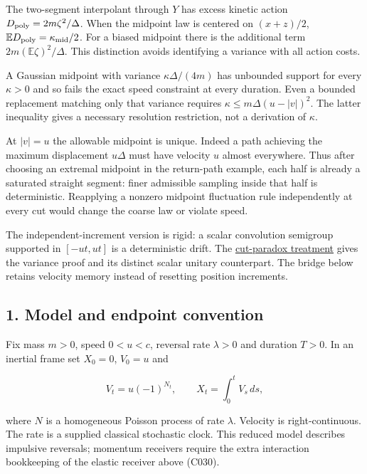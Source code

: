\documentclass[11pt,a4paper]{article}
\begin{document}
The two-segment interpolant through \(Y\) has excess kinetic action
\(D_{\rm poly}=2m\zeta^2/\Delta\). When the midpoint law is centered on
\((x+z)/2\), \(\mathbb E D_{\rm poly}=\kappa_{\rm mid}/2\). For a biased
midpoint there is the additional term \(2m(\mathbb E\zeta)^2/\Delta\).
This distinction avoids identifying a variance with all action costs.

A Gaussian midpoint with variance \(\kappa\Delta/(4m)\) has unbounded
support for every \(\kappa>0\) and so fails the exact speed constraint
at every duration. Even a bounded replacement matching only that
variance requires \(\kappa\le m\Delta(u-|v|)^2\). The latter inequality
gives a necessary resolution restriction, not a derivation of
\(\kappa\).

At \(|v|=u\) the allowable midpoint is unique. Indeed a path achieving
the maximum displacement \(u\Delta\) must have velocity \(u\) almost
everywhere. Thus after choosing an extremal midpoint in the return-path
example, each half is already a saturated straight segment: finer
admissible sampling inside that half is deterministic. Reapplying a
nonzero midpoint fluctuation rule independently at every cut would
change the coarse law or violate speed.

The independent-increment version is rigid: a scalar convolution
semigroup supported in \([-ut,ut]\) is a deterministic drift. The
\href{cut-paradox-two-faces.md\#scalar-probability-kernels}{cut-paradox
treatment} gives the variance proof and its distinct scalar unitary
counterpart. The bridge below retains velocity memory instead of
resetting position increments.

\hypertarget{model-and-endpoint-convention}{%
\subsection{1. Model and endpoint
convention}\label{model-and-endpoint-convention}}

Fix mass \(m>0\), speed \(0<u<c\), reversal rate \(\lambda>0\) and
duration \(T>0\). In an inertial frame set \(X_0=0\), \(V_0=u\) and

\[V_t=u(-1)^{N_t},\qquad X_t=\int_0^t V_s\,ds,\]

where \(N\) is a homogeneous Poisson process of rate \(\lambda\).
Velocity is right-continuous. The rate is a supplied classical
stochastic clock. This reduced model describes impulsive reversals;
momentum receivers require the extra interaction bookkeeping of the
elastic receiver above (C030).
\end{document}
